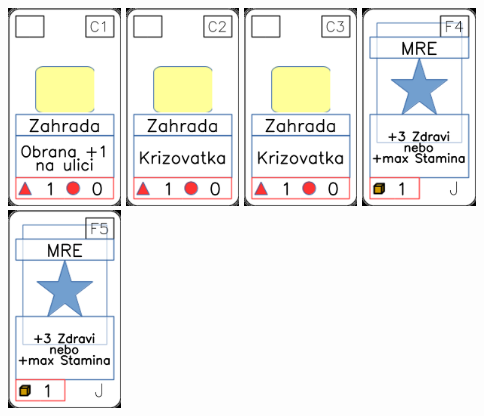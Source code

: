 \documentclass[a4paper]{article}
\begin{document}
	\includegraphics[width=3.0cm]{img-1_25}
	\includegraphics[width=3.0cm]{img-1_26}
	\includegraphics[width=3.0cm]{img-1_27}
	\includegraphics[width=3.0cm]{img-1_28}
	\includegraphics[width=3.0cm]{img-1_29}
\end{document}

